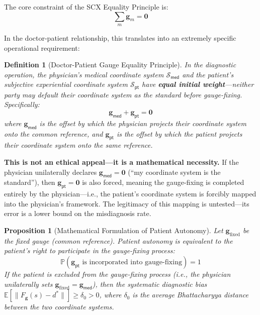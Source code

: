 \documentclass[12pt,a4paper]{article}
\newtheorem{proposition}[theorem]{Proposition}
\newtheorem{definition}[theorem]{Definition}
\theoremstyle{remark}
\newcommand{\Pbb}{\mathbb{P}}
\newcommand{\med}{\textsf{med}}
\newcommand{\pt}{\textsf{pt}}
\begin{document}
The core constraint of the SCX Equality Principle is:
\begin{equation}
    \sum_{m} \mathbf{g}_m = \mathbf{0}
\end{equation}

In the doctor-patient relationship, this translates into an extremely specific operational requirement:

\begin{definition}[Doctor-Patient Gauge Equality Principle]\label{def:equality_principle_medical}
In the diagnostic operation, the physician's medical coordinate system $\mathcal{S}_{\med}$ and the patient's subjective experiential coordinate system $\mathcal{S}_{\pt}$ have \textbf{equal initial weight}---neither party may default their coordinate system as the standard before gauge-fixing. Specifically:
\begin{equation}
    \mathbf{g}_{\med} + \mathbf{g}_{\pt} = \mathbf{0}
\end{equation}
where $\mathbf{g}_{\med}$ is the offset by which the physician projects their coordinate system onto the common reference, and $\mathbf{g}_{\pt}$ is the offset by which the patient projects their coordinate system onto the same reference.
\end{definition}

\textbf{This is not an ethical appeal---it is a mathematical necessity.} If the physician unilaterally declares $\mathbf{g}_{\med} = \mathbf{0}$ (``my coordinate system is the standard''), then $\mathbf{g}_{\pt} = \mathbf{0}$ is also forced, meaning the gauge-fixing is completed entirely by the physician---i.e., the patient's coordinate system is forcibly mapped into the physician's framework. The legitimacy of this mapping is untested---its error is a lower bound on the misdiagnosis rate.

\begin{proposition}[Mathematical Formulation of Patient Autonomy]\label{prop:autonomy}
Let $\mathbf{g}_{\text{fixed}}$ be the fixed gauge (common reference). Patient autonomy is equivalent to the patient's right to participate in the gauge-fixing process:
\begin{equation}
    \Pbb(\mathbf{g}_{\pt} \text{ is incorporated into gauge-fixing}) = 1
\end{equation}
If the patient is excluded from the gauge-fixing process (i.e., the physician unilaterally sets $\mathbf{g}_{\text{fixed}} = \mathbf{g}_{\med}$), then the systematic diagnostic bias $\mathbb{E}[\|F_{\mathbf{g}}(s) - d^*\|] \geq \delta_0 > 0$, where $\delta_0$ is the average Bhattacharyya distance between the two coordinate systems.
\end{proposition}
\end{document}

